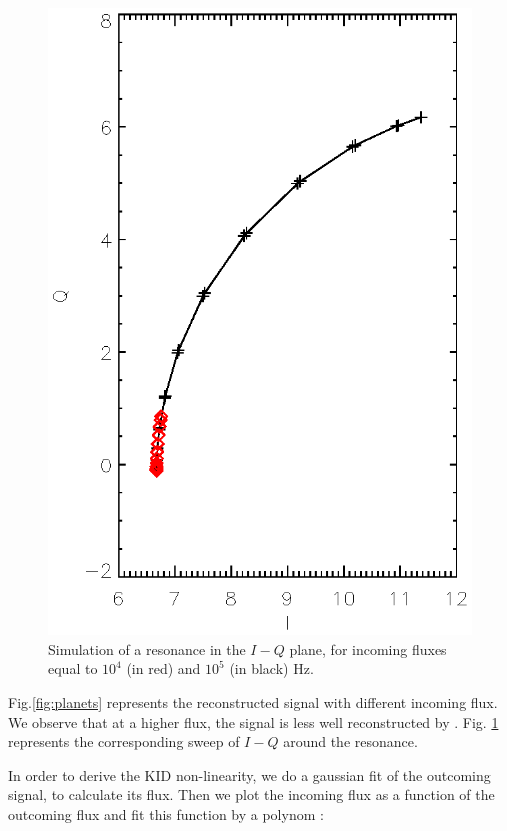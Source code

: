 \begin{figure}[h]
\center
\includegraphics[scale=0.8]{Figures/resonance.eps}
\caption{Simulation of a resonance in the $I-Q$ plane, for incoming fluxes equal to $10^{4}$ (in red) and $10^{5}$ (in black) Hz.}
\label{fig:resonance}
\end{figure}

Fig.\ref{fig:planets} represents the reconstructed signal with different incoming flux. We observe that at a higher flux, the signal is less well reconstructed by \rf. Fig. \ref{fig:resonance} represents the corresponding sweep of $I-Q$ around the resonance.

In order to derive the KID non-linearity, we do a gaussian fit of the outcoming signal, to calculate its flux. Then we plot the incoming flux as a function of the outcoming flux and fit this function by a polynom :

